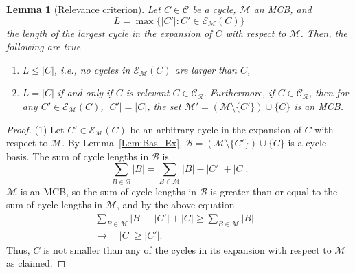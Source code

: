 \documentclass[fleqn,11pt]{article}
\newtheorem{lemma}[theorem]{Lemma}
\newcommand\calB{\mathcal{B}}
\newcommand\calM{\mathcal{M}}
\newcommand\CycSp{\mathcal{C}}    %
\newcommand\expand[2]{\mathcal{E}_{#1}\left(#2\right)}   %
\begin{document}
\begin{lemma}[Relevance criterion]
	Let $C\in\CycSp$ be a cycle, $\calM$ an MCB, and
	$$L = \max\{|C'|:C'\in\expand{\calM}{C}\}$$
	the length of the largest cycle in the expansion of $C$ with respect to $\calM$.
	Then, the following are true
	\begin{enumerate}
		\item $L\le |C|$, i.e., no cycles in $\expand{\calM}{C}$ are larger than $C$,
		\item $L=|C|$ if and only if $C$ is relevant $C\in\mathcal{C_R}$. Furthermore, if $C\in\mathcal{C_R}$, then for any $C'\in\expand{\calM}{C}$, $|C'|=|C|$, the set $\calM'=(\calM\setminus\{C'\})\cup\{C\}$ is an MCB.
	\end{enumerate}
	\label{Lem:Relevant_MCB_Test}
\end{lemma}
\begin{proof}
	(1) Let $C'\in\expand{\calM}{C}$ be an arbitrary cycle in the expansion of $C$ with respect to $\calM$. By Lemma~\ref{Lem:Bas_Ex}, $\calB=(\calM\setminus \{C'\})\cup\{C\}$ is a cycle basis. The sum of cycle lengths in $\calB$ is
	\begin{equation}
		\sum_{B\in\calB} |B| = \sum_{B\in\calM} |B| - |C'| + |C|.
	\end{equation}
	$\calM$ is an MCB, so the sum of cycle lengths in $\calB$ is greater than or equal to the sum of cycle lengths in $\calM$, and by the above equation
	\begin{equation}
		\begin{split}
		\sum_{B\in\calM} |B| - |C'| + |C| \ge \sum_{B\in\calM} |B| \quad \\\longrightarrow \quad |C| \ge |C'|.
		\end{split}
	\end{equation}
	Thus, $C$ is not smaller than any of the cycles in its expansion with respect to $\calM$ as claimed.
	

\end{proof}
\end{document}
